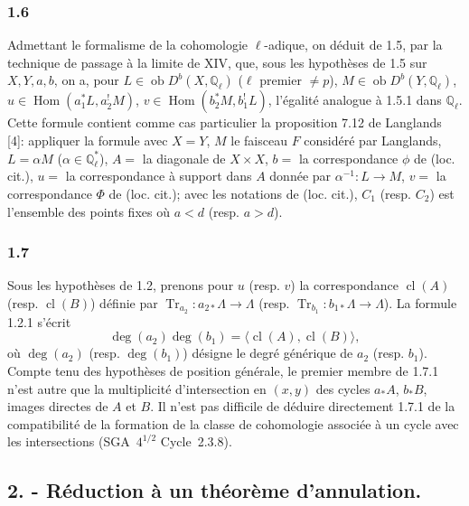 \documentclass[11pt]{article}
\DeclareMathOperator{\Hom}{Hom}
\newcommand{\ob}{\operatorname{ob}}
\providecommand{\cl}{\operatorname{cl}}
\providecommand{\Tr}{\operatorname{Tr}}
\providecommand{\Tr}{\operatorname{Tr}}
\providecommand{\Tr}{\operatorname{Tr}}
\providecommand{\Hom}{\operatorname{Hom}}
\providecommand{\ob}{\operatorname{ob}}
\providecommand{\Tr}{\operatorname{Tr}}
\providecommand{\cl}{\operatorname{cl}}
\providecommand{\Hom}{\operatorname{Hom}}
\providecommand{\cl}{\operatorname{cl}}
\providecommand{\Tr}{\operatorname{Tr}}
\begin{document}
\subsubsection*{1.6}
Admettant le formalisme de la cohomologie $\ell$-adique, on déduit de 1.5, par la technique de passage à la limite de XIV, que, sous les hypothèses de 1.5 sur $X,Y,a,b$, on a, pour $L\in\ob D^b(X,\mathbb Q_\ell)$ ($\ell$ premier $\ne p$), $M\in\ob D^b(Y,\mathbb Q_\ell)$, $u\in\Hom(a_1^*L,a_2^!M)$, $v\in\Hom(b_2^*M,b_1^!L)$, l'égalité analogue à 1.5.1 dans $\mathbb Q_\ell$. Cette formule contient comme cas particulier la proposition 7.12 de Langlands [4]: appliquer la formule avec $X=Y$, $M$ le faisceau $F$ considéré par Langlands, $L=\alpha M$ ($\alpha\in\mathbb Q_\ell^*$), $A=$ la diagonale de $X\times X$, $b=$ la correspondance $\phi$ de (loc. cit.), 
$u=$ la
correspondance à support dans $A$ donnée par $\alpha^{-1}:L\to M$, $v=$ la correspondance $\Phi$ de (loc. cit.); avec les notations de (loc. cit.), $C_1$ (resp. $C_2$) est l'ensemble des points fixes où $a<d$ (resp. $a>d$).

\subsubsection*{1.7}
Sous les hypothèses de 1.2, prenons pour $u$ (resp. $v$) la correspondance $\cl(A)$ (resp. $\cl(B)$) définie par $\Tr_{a_2}:a_{2*}\Lambda\to\Lambda$ (resp. $\Tr_{b_1}:b_{1*}\Lambda\to\Lambda$). La formule 1.2.1 s'écrit
\begin{equation}\tag{1.7.1}
\deg(a_2)\deg(b_1)=\langle \cl(A),\cl(B)\rangle,
\end{equation}
où $\deg(a_2)$ (resp. $\deg(b_1)$) désigne le degré générique de $a_2$ (resp. $b_1$). Compte tenu des hypothèses de position générale, le premier membre de 1.7.1 n'est autre que la multiplicité d'intersection en $(x,y)$ des cycles $a_*A$, $b_*B$, images directes de $A$ et $B$. Il n'est pas difficile de déduire directement 1.7.1 de la compatibilité de la formation de la classe de cohomologie associée à un cycle avec les intersections (SGA~$4^{1/2}$ Cycle~2.3.8).


\subsection*{2. - Réduction à un théorème d'annulation.}
\end{document}
